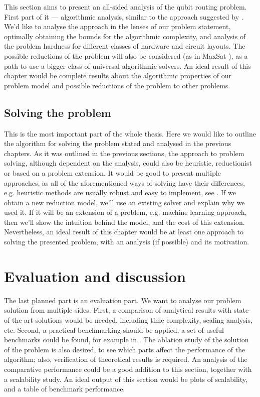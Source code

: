This section aims to present an all-sided analysis of the qubit routing problem. First part of it — algorithmic analysis, similar to the approach suggested by \cite{itoAlgorithmicTheoryQubit2023}. We’d like to analyse the approach in the lenses of our problem statement, optimally obtaining the bounds for the algorithmic complexity, and analysis of the problem hardness for different classes of hardware and circuit layouts. The possible reductions of the problem will also be considered (as in MaxSat \cite{molaviQubitMappingRouting2022}), as a path to use a bigger class of universal algorithmic solvers. An ideal result of this chapter would be complete results about the algorithmic properties of our problem model and possible reductions of the problem to other problems.

\subsection{Solving the problem}

This is the most important part of the whole thesis. Here we would like to outline the algorithm for solving the problem stated and analysed in the previous chapters. As it was outlined in the previous sections, the approach to problem solving, although dependent on the analysis, could also be heuristic, reductionist or based on a problem extension. It would be good to present multiple approaches, as all of the aforementioned ways of solving have their differences, e.g. heuristic methods are usually robust and easy to implement, see \cite{zouLightSABRELightweightEnhanced2024}. If we obtain a new reduction model, we’ll use an existing solver and explain why we used it. If it will be an extension of a problem, e.g. machine learning approach, then we’ll show the intuition behind the model, and the cost of this extension. Nevertheless, an ideal result of this chapter would be at least one approach to solving the presented problem, with an analysis (if possible) and its motivation.

\section{Evaluation and discussion}

The last planned part is an evaluation part. We want to analyse our problem solution from multiple sides. First, a comparison of analytical results with state-of-the-art solutions would be needed, including time complexity, scaling analysis, etc. Second, a practical benchmarking should be applied, a set of useful benchmarks could be found, for example in \cite{cowtanQubitRoutingProblem2019}. The ablation study of the solution of the problem is also desired, to see which parts affect the performance of the algorithm; also, verification of theoretical results is required. An analysis of the comparative performance could be a good addition to this section, together with a scalability study. An ideal output of this section would be plots of scalability, and a table of benchmark performance. 

